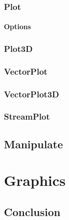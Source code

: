 \documentclass[11pt,letterpaper,twoside,titlepage]{book}
\begin{document}
			\section{Plot}
			
				\subsection{Options}
			
			\section{Plot3D}
			
			\section{VectorPlot}
			
			\section{VectorPlot3D}
			
			\section{StreamPlot}
			
		\chapter{Manipulate}
		
	\part{Graphics}
	
		
	\chapter*{Conclusion}
					
\end{document}
